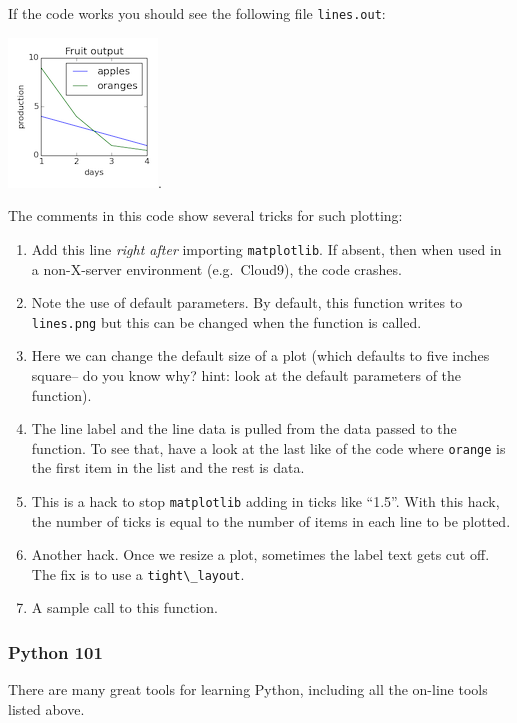 If the code works you should see the following file \texttt{lines.out}:

\includegraphics{img/matplotlib101.png}.

The comments in this code show several tricks for such plotting:

\begin{enumerate}
\def\labelenumi{\arabic{enumi}.}
\itemsep1pt\parskip0pt
\item
  Add this line \emph{right after} importing \texttt{matplotlib}. If
  absent, then when used in a non-X-server environment (e.g.~Cloud9),
  the code crashes.
\item
  Note the use of default parameters. By default, this function writes
  to \texttt{lines.png} but this can be changed when the function is
  called.
\item
  Here we can change the default size of a plot (which defaults to five
  inches square-- do you know why? hint: look at the default parameters
  of the function).
\item
  The line label and the line data is pulled from the data passed to the
  function. To see that, have a look at the last like of the code where
  \texttt{orange} is the first item in the list and the rest is data.
\item
  This is a hack to stop \texttt{matplotlib} adding in ticks like
  ``1.5''. With this hack, the number of ticks is equal to the number of
  items in each line to be plotted.
\item
  Another hack. Once we resize a plot, sometimes the label text gets cut
  off. The fix is to use a \texttt{tight\textbackslash{}\_layout}.
\item
  A sample call to this function.
\end{enumerate}

\subsubsection{Python 101}\label{python-101}

There are many great tools for learning Python, including all the
on-line tools listed above.

